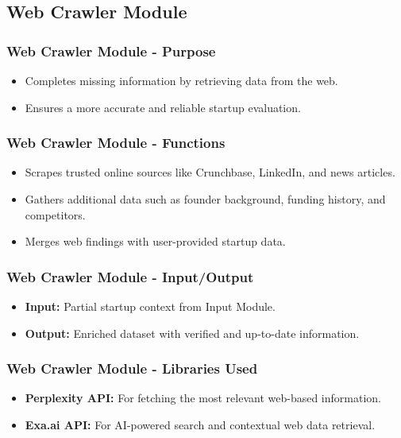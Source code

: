 \documentclass{beamer}
\begin{document}
\subsection{Web Crawler Module}

\begin{frame}
\frametitle{Web Crawler Module - Purpose}
\begin{itemize}
    \item Completes missing information by retrieving data from the web.
    \item Ensures a more accurate and reliable startup evaluation.
\end{itemize}
\end{frame}

\begin{frame}
\frametitle{Web Crawler Module - Functions}
\begin{itemize}
    \item Scrapes trusted online sources like Crunchbase, LinkedIn, and news articles.
    \item Gathers additional data such as founder background, funding history, and competitors.
    \item Merges web findings with user-provided startup data.
\end{itemize}
\end{frame}

\begin{frame}
\frametitle{Web Crawler Module - Input/Output}
\begin{itemize}
    \item \textbf{Input:} Partial startup context from Input Module.
    \item \textbf{Output:} Enriched dataset with verified and up-to-date information.
\end{itemize}
\end{frame}

\begin{frame}
\frametitle{Web Crawler Module - Libraries Used}
\begin{itemize}
    \item \textbf{Perplexity API:} For fetching the most relevant web-based information.
    \item \textbf{Exa.ai API:} For AI-powered search and contextual web data retrieval.
\end{itemize}
\end{frame}

\end{document}
